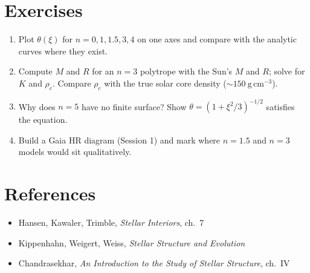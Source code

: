 \section{Exercises}
\begin{enumerate}
\item Plot $\theta(\xi)$ for $n=0,1,1.5,3,4$ on one axes and compare with the analytic curves where they exist.
\item Compute $M$ and $R$ for an $n=3$ polytrope with the Sun's $M$ and $R$; solve for $K$ and $\rho_c$. Compare $\rho_c$ with the true solar core density ($\sim 150\ \mathrm{g\,cm^{-3}}$).
\item Why does $n=5$ have no finite surface? Show $\theta=(1+\xi^2/3)^{-1/2}$ satisfies the equation.
\item Build a Gaia HR diagram (Session 1) and mark where $n=1.5$ and $n=3$ models would sit qualitatively.
\end{enumerate}

\section*{References}
\begin{itemize}
\item Hansen, Kawaler, Trimble, \textit{Stellar Interiors}, ch.\ 7
\item Kippenhahn, Weigert, Weiss, \textit{Stellar Structure and Evolution}
\item Chandrasekhar, \textit{An Introduction to the Study of Stellar Structure}, ch.\ IV
\end{itemize}

